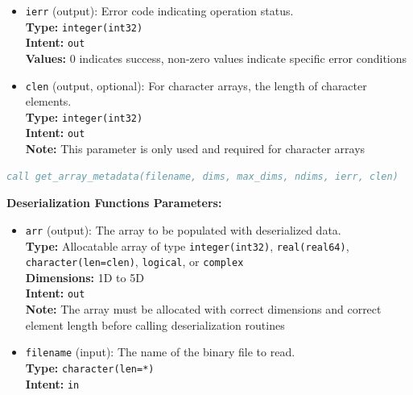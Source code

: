 \documentclass[11pt]{article}
\begin{document}
\begin{enumerate}
\begin{enumerate}
\begin{itemize}
	      	      	\item \texttt{ierr} (output): Error code indicating operation status.
	      	      	      \\ \textbf{Type:} \texttt{integer(int32)} \\ \textbf{Intent:} \texttt{out}
	      	      	      \\ \textbf{Values:} 0 indicates success, non-zero values indicate
	      	      	      specific error conditions
	      	      	      
	      	      	\item \texttt{clen} (output, optional): For character arrays, the length
	      	      	      of character elements. \\ \textbf{Type:} \texttt{integer(int32)}
	      	      	      \\ \textbf{Intent:} \texttt{out} \\ \textbf{Note:} This parameter is
	      	      	      only used and required for character arrays
	      	      \end{itemize}
	      	      \begin{lstlisting}[language=fortran, caption={Usage of metadata retrieval}]
call get_array_metadata(filename, dims, max_dims, ndims, ierr, clen)
	      	      \end{lstlisting}
	      	      
	      	      \textbf{Deserialization Functions Parameters:}
	      	      \begin{itemize}
	      	      	\item \texttt{arr} (output): The array to be populated with deserialized
	      	      	      data. \\ \textbf{Type:} Allocatable array of type \texttt{integer(int32)},
	      	      	      \texttt{real(real64)}, \texttt{character(len=clen)}, \texttt{logical},
	      	      	      or \texttt{complex} \\ \textbf{Dimensions:} 1D to 5D \\ \textbf{Intent:}
	      	      	      \texttt{out} \\ \textbf{Note:} The array must be allocated with
	      	      	      correct dimensions and correct element length before calling
	      	      	      deserialization routines
	      	      	      
	      	      	\item \texttt{filename} (input): The name of the binary file to read.
	      	      	      \\ \textbf{Type:} \texttt{character(len=*)} \\ \textbf{Intent:} \texttt{in}
	      	      	      

\end{itemize}
\end{enumerate}
\end{enumerate}
\end{document}
